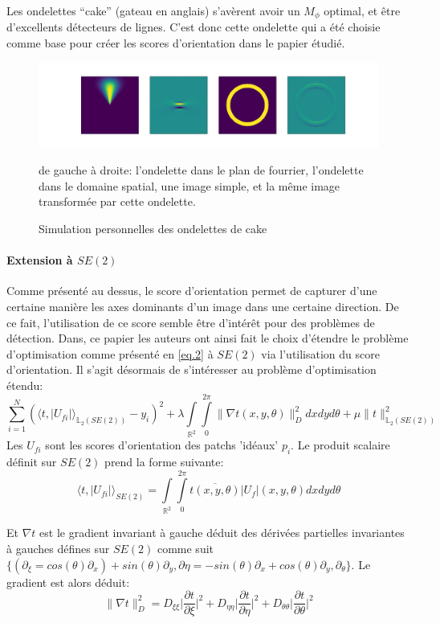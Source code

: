 \documentclass{article}
\begin{document}
Les ondelettes ``cake'' (gateau en anglais) s'avèrent avoir un $ M_{\phi} $ optimal, et
être d'excellents détecteurs de lignes. C'est donc cette ondelette qui a été choisie
comme base pour créer les scores d'orientation dans le papier étudié.
\begin{figure}[htpb]
\centering
\hspace*{-6em}
\includegraphics[scale=0.39]{plots/cake_wavelet.png}
\caption {Simulation personnelles des ondelettes de  cake}
de gauche à droite: l'ondelette dans le plan de fourrier, l'ondelette dans le domaine
spatial, une image simple, et la même image transformée par cette ondelette.
\end{figure}

\paragraph{Extension à $SE(2)$}
Comme présenté au dessus, le score d'orientation permet de capturer d'une certaine manière les axes dominants d'un image dans une certaine direction. De ce fait, 
l'utilisation de ce score semble être d'intérêt pour des problèmes de détection.
Dans, ce papier les auteurs ont ainsi fait le choix d'étendre le problème d'optimisation comme présenté en \ref{eq.2} à $SE(2)$ via 
l'utilisation du score d'orientation. Il s'agit désormais de s'intéresser au problème d'optimisation étendu:
\[
  \sum \limits_{i=1}^N (\langle t, |U_{fi}| \rangle_{{\mathbb{L}_2(SE(2))}} - y_i)^2 + \lambda \int \limits_{\mathbb{R}^2} \int \limits_{0}^{2\pi} \lVert 
  \nabla t(x, y, \theta)\rVert_{D}^2 dxdyd\theta + \mu \lVert t \rVert_{\mathbb{L}_2(SE(2))}^2
\]
Les $U_{fi}$ sont les scores d'orientation des patchs 'idéaux' $p_i$. 
Le produit scalaire définit sur $SE(2)$ prend la forme suivante:
\[
    \langle t, |U_{fi}| \rangle_{SE(2)} = 
    \int \limits_{\mathbb{R}^2} \int \limits_{0}^{2\pi} \overline{t(x, y, \theta)} |U_f|(x, y, \theta)dxdyd\theta
\]

Et $\nabla t$ est le gradient invariant à gauche déduit des dérivées partielles invariantes à gauches défines sur $SE(2)$
comme suit $\{(\partial_{\xi} = cos(\theta)\partial_x) + sin(\theta) \partial_y, \partial{\eta} = -sin(\theta) \partial_x + cos(\theta)
\partial_y, \partial_{\theta}\}$. Le gradient est alors déduit:
\[
    \lVert \nabla t \rVert_{D}^2 = D_{\xi \xi} \Big|\frac{\partial t}{\partial \xi} \Big|^2
    + D_{\eta \eta} \Big|\frac{\partial t}{\partial \eta}\Big|^2 + D_{\theta \theta} \Big|\frac{\partial t}{\partial \theta}\Big|^2
\]
\end{document}
